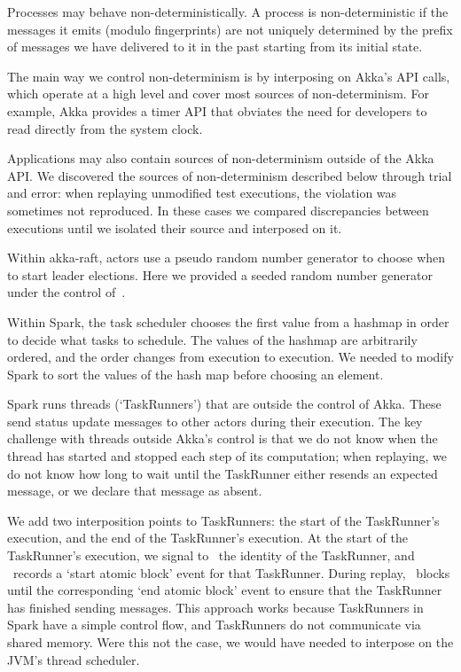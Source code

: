  Processes may behave non-deterministically.
A process is non-deterministic if the messages it emits
(modulo fingerprints) are not uniquely determined by the prefix of messages we have
delivered to it in the past starting from its initial state.

The main way we control non-determinism is by interposing on Akka's API calls,
which operate at a high level and cover most sources of non-determinism.
For example, Akka provides a timer API that
obviates the need for developers to read directly from the system clock.

Applications may also contain sources of non-determinism outside of the Akka
API. We discovered the sources of non-determinism described below through trial and
error: when replaying unmodified test executions, the violation was sometimes not
reproduced. In these cases we compared discrepancies between executions until we
isolated their source and interposed on it.

 Within akka-raft, actors use a
pseudo random number generator to choose when to
start leader elections. Here we provided a seeded random
number generator under the control of~\sys.

 Within Spark, the task scheduler chooses the first value from a hashmap in order
to decide what tasks to schedule. The values of the hashmap are
arbitrarily ordered, and the order changes from execution to execution. We needed to modify
Spark to sort the values of the hash map before choosing an element.

Spark runs threads (`TaskRunners') that are outside the control of
Akka. These send status
update messages to other actors during their execution.
The key challenge with threads outside Akka's control is that we do not know
when the thread has started and stopped each step of its computation;
when replaying, we do not know how long to wait until the TaskRunner either resends
an expected message, or we declare that message as absent.

We add two interposition points to TaskRunners:
the start of the
TaskRunner's execution, and the end of the TaskRunner's execution.
At the start of the TaskRunner's execution, we signal to \sys~the identity of the TaskRunner,
and \sys~records a `start atomic block' event for that TaskRunner. During
replay, \sys~blocks until the corresponding `end atomic block' event to ensure
that the TaskRunner has finished sending messages. This approach
works because TaskRunners in
Spark have a simple control flow, and TaskRunners do not communicate via shared memory. Were this
not the case, we would have needed to interpose on the JVM's thread scheduler.

